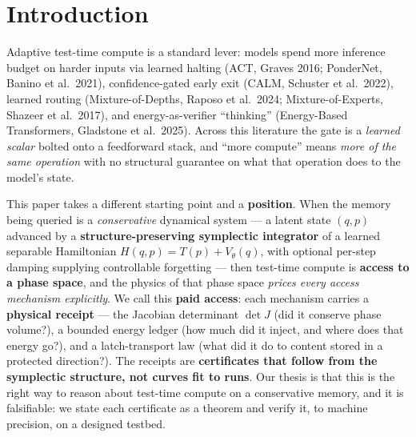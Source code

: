 \documentclass[11pt]{article}
\newcommand{\detJ}{\det J}
\begin{document}
\begin{abstract}
$\detJ=1$ channel and inherits its receipt --- the certificate prices only transport. The fine print travels with the claim: volume preservation \emph{alone} is not the latch receipt (a $\detJ=1$ random shift also scrambles the charge --- the \emph{matched channel} is what preserves it), and a bounded --- even \emph{free} --- energy ledger does not buy BIBO (a $\Delta H=0$ exit into a non-coercive region escapes with $r^\ast\propto T$; coercive-\emph{component} membership is the operative clause). We then situate three \emph{honest} pillars on \textbf{learned} memories, each scoped and priced in-line: a distribution-free calibrated compute-rationing gate whose mechanism is \textbf{memory-agnostic}; a direct one-hop non-local edge whose cost is flat in the number of units where multi-hop diffusion scales; and a settled regime map on which a modern Hopfield network is the cheaper \emph{and} more cue-noise-robust retriever at matched accuracy, the CLU gate reaching Hopfield accuracy only for clean/correlated cues at small capacity. The contribution is the \textbf{certificate stack and its discipline}, not a benchmark win.
\end{abstract}

\section{Introduction}
Adaptive test-time compute is a standard lever: models spend more inference budget on harder inputs via learned halting (ACT, Graves 2016; PonderNet, Banino et al.\ 2021), confidence-gated early exit (CALM, Schuster et al.\ 2022), learned routing (Mixture-of-Depths, Raposo et al.\ 2024; Mixture-of-Experts, Shazeer et al.\ 2017), and energy-as-verifier ``thinking'' (Energy-Based Transformers, Gladstone et al.\ 2025). Across this literature the gate is a \emph{learned scalar} bolted onto a feedforward stack, and ``more compute'' means \emph{more of the same operation} with no structural guarantee on what that operation does to the model's state.

This paper takes a different starting point and a \textbf{position}. When the memory being queried is a \emph{conservative} dynamical system --- a latent state $(q,p)$ advanced by a \textbf{structure-preserving symplectic integrator} of a learned separable Hamiltonian $H(q,p)=T(p)+V_\theta(q)$, with optional per-step damping supplying controllable forgetting --- then test-time compute is \textbf{access to a phase space}, and the physics of that phase space \emph{prices every access mechanism explicitly}. We call this \textbf{paid access}: each mechanism carries a \textbf{physical receipt} --- the Jacobian determinant $\detJ$ (did it conserve phase volume?), a bounded energy ledger (how much did it inject, and where does that energy go?), and a latch-transport law (what did it do to content stored in a protected direction?). The receipts are \textbf{certificates that follow from the symplectic structure, not curves fit to runs}. Our thesis is that this is the right way to reason about test-time compute on a conservative memory, and it is falsifiable: we state each certificate as a theorem and verify it, to machine precision, on a designed testbed.
\end{document}
